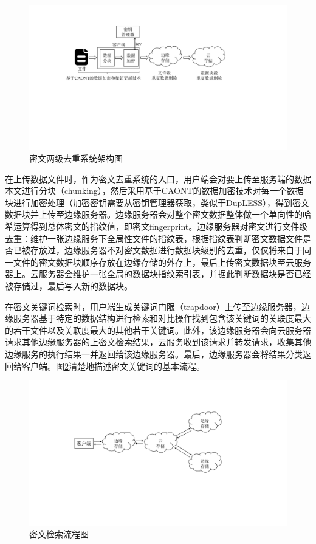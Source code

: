 \documentclass[promaster]{thesis-uestc}
\begin{document}
\begin{figure}[htbp] %
    \centering
    \includegraphics[width = 1.0\linewidth]{pic/jiagoutu.pdf}
    \caption{密文两级去重系统架构图}
    \label{密文两级去重系统架构图}
\end{figure}

在上传数据文件时，作为密文去重系统的入口，用户端会对要上传至服务端的数据本文进行分块（chunking），然后采用基于CAONT的数据加密技术对每一个数据块进行加密处理（加密密钥需要从密钥管理器获取，类似于DupLESS），得到密文数据块并上传至边缘服务器。边缘服务器会对整个密文数据整体做一个单向性的哈希运算得到总体密文的指纹值，即密文fingerprint。边缘服务器对密文进行文件级去重：维护一张边缘服务下全局性文件的指纹表，根据指纹表判断密文数据文件是否已被存放过，边缘服务器不对密文数据进行数据块级别的去重，仅仅将来自于同一文件的密文数据块顺序存放在边缘存储的外存上，最后上传密文数据块至云服务器上。云服务器会维护一张全局的数据块指纹索引表，并据此判断数据块是否已经被存储过，最后写入新的数据块。

在密文关键词检索时，用户端生成关键词门限（trapdoor）上传至边缘服务器，边缘服务器基于特定的数据结构进行检索和对比操作找到包含该关键词的关联度最大的若干文件以及关联度最大的其他若干关键词。此外，该边缘服务器会向云服务器请求其他边缘服务器的上密文检索结果，云服务收到该请求并转发请求，收集其他边缘服务的执行结果一并返回给该边缘服务器。最后，边缘服务器会将结果分类返回给客户端。图\ref{密文检索流程图}清楚地描述密文关键词的基本流程。

\begin{figure}[htbp]  %
    \centering
    \includegraphics[width = 1.0\linewidth]{pic/miwenjiansuoliuchengtu.pdf}
    \caption{密文检索流程图}
    \label{密文检索流程图}
\end{figure}
\end{document}
